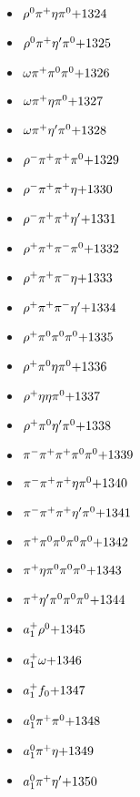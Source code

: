 \begin{multicols}{3}
\begin{itemize}
 \item $ \rho^{0} \pi^{+} \eta \pi^{0} \hfill{+1324}$
 \item $ \rho^{0} \pi^{+} {\eta^{\prime}} \pi^{0} \hfill{+1325}$
 \item $ \omega \pi^{+} \pi^{0} \pi^{0} \hfill{+1326}$
 \item $ \omega \pi^{+} \eta \pi^{0} \hfill{+1327}$
 \item $ \omega \pi^{+} {\eta^{\prime}} \pi^{0} \hfill{+1328}$
 \item $ \rho^{-} \pi^{+} \pi^{+} \pi^{0} \hfill{+1329}$
 \item $ \rho^{-} \pi^{+} \pi^{+} \eta \hfill{+1330}$
 \item $ \rho^{-} \pi^{+} \pi^{+} {\eta^{\prime}} \hfill{+1331}$
 \item $ \rho^{+} \pi^{+} \pi^{-} \pi^{0} \hfill{+1332}$
 \item $ \rho^{+} \pi^{+} \pi^{-} \eta \hfill{+1333}$
 \item $ \rho^{+} \pi^{+} \pi^{-} {\eta^{\prime}} \hfill{+1334}$
 \item $ \rho^{+} \pi^{0} \pi^{0} \pi^{0} \hfill{+1335}$
 \item $ \rho^{+} \pi^{0} \eta \pi^{0} \hfill{+1336}$
 \item $ \rho^{+} \eta \eta \pi^{0} \hfill{+1337}$
 \item $ \rho^{+} \pi^{0} {\eta^{\prime}} \pi^{0} \hfill{+1338}$
 \item $ \pi^{-} \pi^{+} \pi^{+} \pi^{0} \pi^{0} \hfill{+1339}$
 \item $ \pi^{-} \pi^{+} \pi^{+} \eta \pi^{0} \hfill{+1340}$
 \item $ \pi^{-} \pi^{+} \pi^{+} {\eta^{\prime}} \pi^{0} \hfill{+1341}$
 \item $ \pi^{+} \pi^{0} \pi^{0} \pi^{0} \pi^{0} \hfill{+1342}$
 \item $ \pi^{+} \eta \pi^{0} \pi^{0} \pi^{0} \hfill{+1343}$
 \item $ \pi^{+} {\eta^{\prime}} \pi^{0} \pi^{0} \pi^{0} \hfill{+1344}$
 \item $ a_{1}^{+} \rho^{0} \hfill{+1345}$
 \item $ a_{1}^{+} \omega \hfill{+1346}$
 \item $ a_{1}^{+} f_{0} \hfill{+1347}$
 \item $ a_{1}^{0} \pi^{+} \pi^{0} \hfill{+1348}$
 \item $ a_{1}^{0} \pi^{+} \eta \hfill{+1349}$
 \item $ a_{1}^{0} \pi^{+} {\eta^{\prime}} \hfill{+1350}$

\end{itemize}
\end{multicols}
